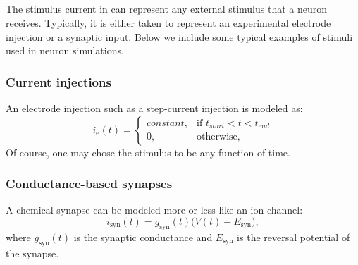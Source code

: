 



\subsection{}
\label{sec:Neuron:stim}
The stimulus current in  can represent any external stimulus that a neuron receives. Typically, it is either taken to represent an experimental electrode injection or a synaptic input. Below we include some typical examples of stimuli used in neuron simulations. 

\subsubsection{Current injections}
An electrode injection such as a step-current injection is modeled as:
\begin{equation}
i_\text{e}(t)= 
\begin{cases}
    constant, & \text{if } t_{start} < t < t_{end} \\
    0,              & \text{otherwise},
\end{cases}
\label{eq:Neuron:injected}
\end{equation}
Of course, one may chose the stimulus to be any function of time.


\subsubsection{Conductance-based synapses}
\label{sec:Ch-Neuron:conductance-based-synapses}
A chemical synapse can be modeled more or less like an ion channel:
\begin{equation}
i_\text{syn}(t) = {g}_\text{syn}(t) \big(V(t)-E_\text{syn} \big), 
\label{eq:Neuron:chemicalsynapse}
\end{equation}
where $g_\text{syn}(t)$ is the synaptic conductance and $E_\text{syn}$ is the reversal potential of the synapse. 

